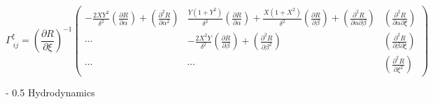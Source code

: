 \documentclass{article}
\makeatletter
\renewcommand\section{\@startsection
  {section}{2}{0mm}%
  {-\baselineskip}%
  {0.5\baselineskip}%
  {\normalfont\Huge\bfseries}}%
\newcommand{\pdiff}[2]{\frac{\partial #1}{\partial #2}}
\makeatother
\begin{document}
\begin{equation}
\Gamma^{\xi}_{\ i j} = \left( \pdiff{R}{\xi} \right)^{-1} \left( \begin{array}{ccc} \displaystyle - \frac{2 X Y^2}{\delta^2} \left( \pdiff{R}{\alpha} \right) + \left( \frac{\partial^2 R}{\partial \alpha^2} \right) & \displaystyle \frac{Y (1+Y^2)}{\delta^2} \left( \pdiff{R}{\alpha} \right) + \frac{X (1+X^2)}{\delta^2} \left( \pdiff{R}{\beta} \right) + \left( \frac{\partial^2 R}{\partial \alpha \partial \beta} \right) & \displaystyle \left( \frac{\partial^2 R}{\partial \alpha \partial \xi} \right) \\[4.0ex] \cdots & \displaystyle - \frac{2 X^2 Y}{\delta^2} \left( \pdiff{R}{\beta} \right) + \left( \frac{\partial^2 R}{\partial \beta^2} \right) & \displaystyle \left( \frac{\partial^2 R}{\partial \beta \partial \xi} \right) \\[4.0ex] \cdots & \cdots & \displaystyle \left( \frac{\partial^2 R}{\partial \xi^2} \right)  \end{array} \right)
\end{equation}

\section{Hydrodynamics}
\end{document}
